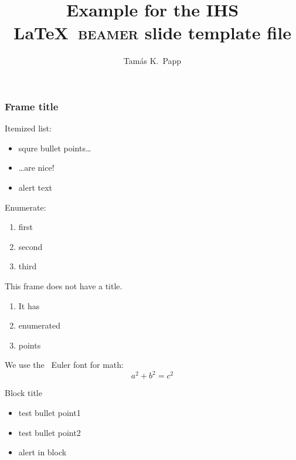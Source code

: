 \documentclass{beamer}
\begin{document}
\title[Short title]{Example for the IHS \LaTeX\ \textsc{beamer} slide template file}
\author[Tam\'as]{Tam\'as K.~Papp}

\begin{frame}[plain]
  \titlepage
\end{frame}

\begin{frame}
  \frametitle{Frame title}

  Itemized list:

  \begin{itemize}
  \item squre bullet points\dots
  \item \dots are nice!
  \item \alert{alert text}
  \end{itemize}
  
  Enumerate:

  \begin{enumerate}
  \item first
  \item second
  \item third
  \end{enumerate}

\end{frame}

\begin{frame}
  This frame does not have a title.
  \begin{enumerate}
  \item It has
  \item enumerated
  \item points
  \end{enumerate}
  We use the \AmS\ Euler font for math:
  \begin{equation*}
    a^2+b^2=c^2
  \end{equation*}

  \begin{block}{Block title}
    \begin{itemize}
    \item test bullet point1
    \item test bullet point2
    \item \alert{alert in block}
    \end{itemize}
  \end{block}

\end{frame}
\end{document}
